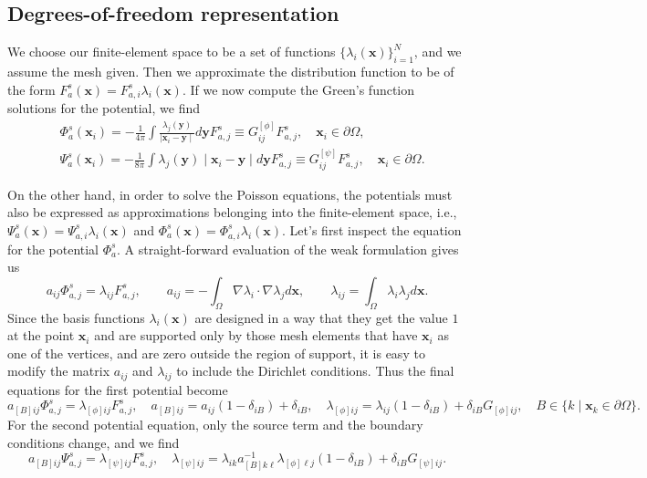 \documentclass[reprint]{revtex4}
\begin{document}
\subsection{Degrees-of-freedom representation}
We choose our finite-element space to be a set of functions $\{\lambda_i(\bm{x})\}_{i=1}^{N}$, and we assume the mesh given. Then we approximate the distribution function to be of the form $F^s_a(\bm{x})=F^s_{a,i}\lambda_i(\bm{x})$. If we now compute the Green's function solutions for the potential, we find
\begin{align}
&\Phi_a^s(\bm{x}_i)=-\frac{1}{4\pi}\int \frac{\lambda_j(\bm{y})}{\mid \bm{x}_i-\bm{y}\mid}d\bm{y}F_{a,j}^s\equiv G^{[\phi]}_{ij}F_{a,j}^s, \quad \bm{x}_i\in\partial\Omega,\\
&\Psi_a^s(\bm{x}_i)=-\frac{1}{8\pi}\int \lambda_j(\bm{y})\mid \bm{x}_i-\bm{y}\mid d\bm{y}F_{a,j}^s\equiv G^{[\psi]}_{ij}F_{a,j}^s, \quad \bm{x}_i\in\partial\Omega.
\end{align}

On the other hand, in order to solve the Poisson equations, the potentials must also be expressed as approximations belonging into the finite-element space, i.e., $\Psi^s_a(\bm{x})=\Psi^s_{a,i}\lambda_i(\bm{x})$ and $\Phi^s_a(\bm{x})=\Phi^s_{a,i}\lambda_i(\bm{x})$. Let's first inspect the equation for the potential $\Phi^s_a$. A straight-forward evaluation of the weak formulation gives us
\begin{equation}
a_{ij}\Phi^s_{a,j}=\lambda_{ij}F^s_{a,j},\qquad a_{ij}=-\int_\Omega\nabla\lambda_i\cdot\nabla\lambda_jd\bm{x},\qquad \lambda_{ij}=\int_\Omega\lambda_i\lambda_jd\bm{x}.
\end{equation}
Since the basis functions $\lambda_i(\bm{x})$ are designed in a way that they get the value $1$ at the point $\bm{x}_i$ and are supported only by those mesh elements that have $\bm{x}_i$ as one of the vertices, and are zero outside the region of support, it is easy to modify the matrix $a_{ij}$ and $\lambda_{ij}$ to include the Dirichlet conditions. Thus the final equations for the first potential become
\begin{equation}
a_{[B]ij}\Phi^s_{a,j}=\lambda_{[\phi]ij}F^s_{a,j},\quad a_{[B]ij}=a_{ij}\left(1-\delta_{iB}\right) + \delta_{iB},\quad \lambda_{[\phi]ij}=\lambda_{ij}\left(1-\delta_{iB}\right) + \delta_{iB}G_{[\phi]ij},\quad B\in\{k\mid\bm{x}_k\in\partial\Omega\}.
\end{equation}
For the second potential equation, only the source term and the boundary conditions change, and we find
\begin{equation}
a_{[B]ij}\Psi^s_{a,j}=\lambda_{[\psi]ij}F^s_{a,j},\quad \lambda_{[\psi]ij}=\lambda_{ik}a_{[B]k\ell}^{-1}\lambda_{[\phi]\ell j}(1-\delta_{iB})+\delta_{iB}G_{[\psi]ij}.
\end{equation}
\end{document}
